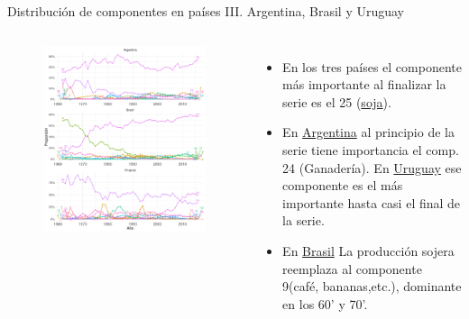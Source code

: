 \documentclass[compress]{beamer}
\begin{document}
\begin{frame}
\small
Distribución de componentes en países III. Argentina, Brasil y Uruguay
\scriptsize
\begin{columns}[c] 

\begin{figure}
\includegraphics[width=\linewidth]{graficoLDA_k30_ARG_BRA_URY}
\end{figure}


\begin{itemize}[label=\faRebel]
\item En los tres países el componente más importante al finalizar la serie es el 25 (\underline{soja}).
\item En \underline{Argentina} al principio de la serie tiene importancia el comp. 24 (Ganadería). En \underline{Uruguay} ese componente es el más importante hasta casi el final de la serie.
\item En \underline{Brasil} La producción sojera reemplaza al componente 9(café, bananas,etc.), dominante en los 60' y 70'.
\end{itemize}

\end{columns} 

\end{frame}
\end{document}
